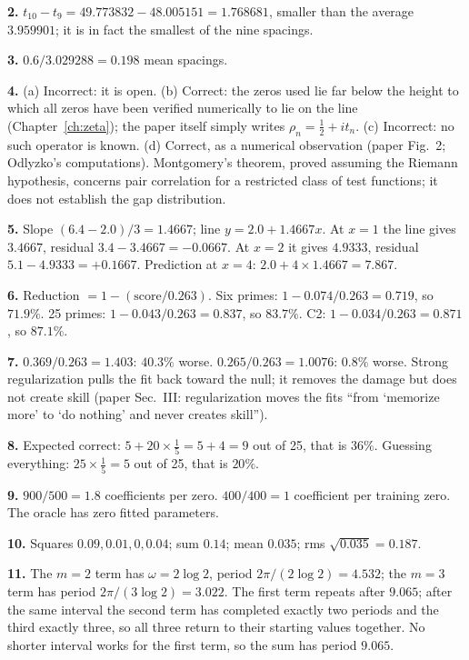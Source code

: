 \textbf{2.} $t_{10} - t_9 = 49.773832 - 48.005151 = 1.768681$, smaller than the average $3.959901$; it is in fact the smallest of the nine spacings.

\textbf{3.} $0.6/3.029288 = 0.198$ mean spacings.

\textbf{4.} (a) Incorrect: it is open. (b) Correct: the zeros used lie far below the height to which all zeros have been verified numerically to lie on the line (Chapter~\ref{ch:zeta}); the paper itself simply writes $\rho_n = \tfrac12 + i t_n$. (c) Incorrect: no such operator is known. (d) Correct, as a numerical observation (paper Fig.~2; Odlyzko's computations). Montgomery's theorem, proved assuming the Riemann hypothesis, concerns pair correlation for a restricted class of test functions; it does not establish the gap distribution.

\textbf{5.} Slope $(6.4 - 2.0)/3 = 1.4667$; line $y = 2.0 + 1.4667x$. At $x=1$ the line gives $3.4667$, residual $3.4 - 3.4667 = -0.0667$. At $x=2$ it gives $4.9333$, residual $5.1 - 4.9333 = +0.1667$. Prediction at $x = 4$: $2.0 + 4\times1.4667 = 7.867$.

\textbf{6.} Reduction $= 1 - (\text{score}/0.263)$. Six primes: $1 - 0.074/0.263 = 0.719$, so $71.9\%$. 25 primes: $1 - 0.043/0.263 = 0.837$, so $83.7\%$. C2: $1 - 0.034/0.263 = 0.871$, so $87.1\%$.

\textbf{7.} $0.369/0.263 = 1.403$: $40.3\%$ worse. $0.265/0.263 = 1.0076$: $0.8\%$ worse. Strong regularization pulls the fit back toward the null; it removes the damage but does not create skill (paper Sec.~III: regularization moves the fits ``from `memorize more' to `do nothing' and never creates skill'').

\textbf{8.} Expected correct: $5 + 20\times\tfrac15 = 5 + 4 = 9$ out of 25, that is $36\%$. Guessing everything: $25\times\tfrac15 = 5$ out of 25, that is $20\%$.

\textbf{9.} $900/500 = 1.8$ coefficients per zero. $400/400 = 1$ coefficient per training zero. The oracle has zero fitted parameters.

\textbf{10.} Squares $0.09, 0.01, 0, 0.04$; sum $0.14$; mean $0.035$; rms $\sqrt{0.035} = 0.187$.

\textbf{11.} The $m=2$ term has $\omega = 2\log2$, period $2\pi/(2\log 2) = 4.532$; the $m=3$ term has period $2\pi/(3\log 2) = 3.022$. The first term repeats after $9.065$; after the same interval the second term has completed exactly two periods and the third exactly three, so all three return to their starting values together. No shorter interval works for the first term, so the sum has period $9.065$.

